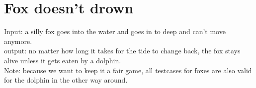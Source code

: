 \documentclass[a4paper,11pt]{article}
\begin{document}
    \section{Fox doesn't drown}
    Input: a silly fox goes into the water and goes in to deep and can't move anymore.\\
    output: no matter how long it takes for the tide to change back, the fox stays alive unless it gets eaten by a dolphin.\\
    
    
    Note: because we want to keep it a fair game, all testcases for foxes are also valid for the dolphin in the other way around.\\
\end{document}
